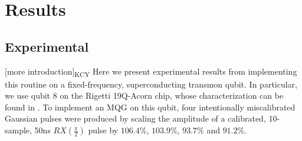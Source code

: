 \documentclass[aps,nofootinbib,pra,notitlepage,twocolumn]{revtex4-1}
\newcommand{\kcy}[1]{{\color{red}[#1]\textsubscript{\rm{KCY}}}}
\begin{document}
\section{Results} %
\label{sec:results}


\subsection{Experimental} %
\label{sub:experimental}
\kcy{more introduction} 
Here we present experimental results from implementing this routine on a fixed-frequency, superconducting transmon qubit. In particular, we use qubit 8 on the Rigetti 19Q-Acorn chip, whose characterization can be found in \cite{1712.05771}. To implement an MQG on this qubit, four intentionally miscalibrated Gaussian pulses were produced by scaling the amplitude of a calibrated, 10-sample, 50ns $RX(\frac{\pi}{2})$ pulse by $106.4\%$,  $103.9\%$, $93.7\%$ and $91.2\%$.
\end{document}
